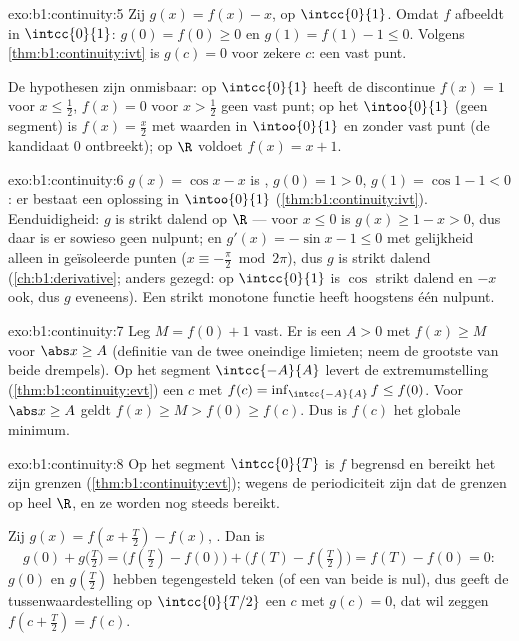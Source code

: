 \begin{solution}{exo:b1:continuity:5}
Zij $g(x) = f(x) - x$,  op $\intcc{0}{1}$. Omdat $f$ afbeeldt
in $\intcc{0}{1}$: $g(0) = f(0) \geq 0$ en $g(1) = f(1) - 1 \leq 0$.
Volgens \cref{thm:b1:continuity:ivt} is $g(c) = 0$ voor zekere $c$:
een vast punt.

De hypothesen zijn onmisbaar: op $\intcc{0}{1}$ heeft de discontinue
 $f(x) = 1$ voor $x \leq \frac12$, $f(x) = 0$ voor $x >
\frac12$ geen vast punt; op het  $\intoo{0}{1}$ (geen
segment) is $f(x) = \frac x2$  met waarden in $\intoo{0}{1}$
en zonder vast punt (de kandidaat $0$ ontbreekt); op $\R$ voldoet
$f(x) = x + 1$.
\end{solution}

\begin{solution}{exo:b1:continuity:6}
$g(x) = \cos x - x$ is , $g(0) = 1 > 0$, $g(1) = \cos 1 - 1 <
0$: er bestaat een oplossing in $\intoo{0}{1}$
(\cref{thm:b1:continuity:ivt}). Eenduidigheid: $g$ is strikt dalend
op $\R$ --- voor $x \leq 0$ is $g(x) \geq 1 - x > 0$, dus daar is er
sowieso geen nulpunt; en $g'(x) = -\sin x - 1 \leq 0$ met gelijkheid
alleen in geïsoleerde punten ($x \equiv -\frac\pi2 \bmod 2\pi$), dus
$g$ is strikt dalend (\cref{ch:b1:derivative}; anders gezegd: op
$\intcc{0}{1}$ is $\cos$ strikt dalend en $-x$ ook, dus $g$
eveneens). Een strikt monotone functie heeft hoogstens één nulpunt.
\end{solution}

\begin{solution}{exo:b1:continuity:7}
Leg $M = f(0) + 1$ vast. Er is een $A > 0$ met $f(x) \geq M$ voor
$\abs x \geq A$ (definitie van de twee oneindige limieten; neem de
grootste van beide drempels). Op het segment $\intcc{-A}{A}$ levert
de extremumstelling (\cref{thm:b1:continuity:evt}) een $c$ met $f(c)
= \inf_{\intcc{-A}{A}} f \leq f(0)$. Voor $\abs x \geq A$ geldt
$f(x) \geq M > f(0) \geq f(c)$. Dus is $f(c)$ het globale minimum.
\end{solution}

\begin{solution}{exo:b1:continuity:8}
Op het segment $\intcc{0}{T}$ is $f$ begrensd en bereikt het zijn
grenzen (\cref{thm:b1:continuity:evt}); wegens de periodiciteit zijn
dat de grenzen op heel $\R$, en ze worden nog steeds bereikt.

Zij $g(x) = f(x + \frac T2) - f(x)$, . Dan is
\[
g(0) + g\bigl(\tfrac T2\bigr)
= \bigl(f(\tfrac T2) - f(0)\bigr) + \bigl(f(T) - f(\tfrac T2)\bigr)
= f(T) - f(0) = 0 :
\]
$g(0)$ en $g(\frac T2)$ hebben tegengesteld teken (of een van beide
is nul), dus geeft de tussenwaardestelling op $\intcc{0}{T/2}$ een
$c$ met $g(c) = 0$, dat wil zeggen $f(c + \frac T2) = f(c)$.
\end{solution}

